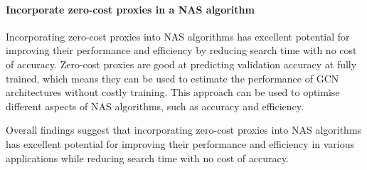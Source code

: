 \paragraph{Incorporate zero-cost proxies in a NAS algorithm}
Incorporating zero-cost proxies into \gls{NAS} algorithms has excellent potential for improving their performance and efficiency by reducing search time with no cost of accuracy. Zero-cost proxies are good at predicting validation accuracy at fully trained, which means they can be used to estimate the performance of \gls{GCN} architectures without costly training. This approach can be used to optimise different aspects of \gls{NAS} algorithms, such as accuracy and efficiency.

Overall findings suggest that incorporating zero-cost proxies into \gls{NAS} algorithms has excellent potential for improving their performance and efficiency in various applications while reducing search time with no cost of accuracy.
